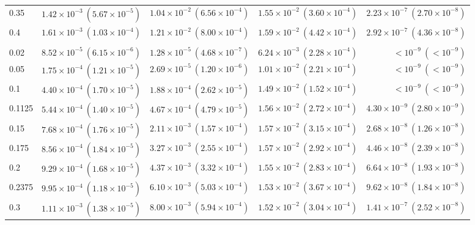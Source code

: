 \begin{table}[htbp]
\begin{tabular}{@{} l rrrr @{}}
0.35 & $1.42\!\times\!10^{-3}\ (5.67\!\times\!10^{-5})$ & $1.04\!\times\!10^{-2}\ (6.56\!\times\!10^{-4})$ & $1.55\!\times\!10^{-2}\ (3.60\!\times\!10^{-4})$ & $2.23\!\times\!10^{-7}\ (2.70\!\times\!10^{-8})$ \\
0.4 & $1.61\!\times\!10^{-3}\ (1.03\!\times\!10^{-4})$ & $1.21\!\times\!10^{-2}\ (8.00\!\times\!10^{-4})$ & $1.59\!\times\!10^{-2}\ (4.42\!\times\!10^{-4})$ & $2.92\!\times\!10^{-7}\ (4.36\!\times\!10^{-8})$ \\
\addlinespace
\multicolumn{5}{@{}l}{\textit{Wide ($p \sim \mathcal{U}(0.05, 0.3)$)}} \\
0.02 & $8.52\!\times\!10^{-5}\ (6.15\!\times\!10^{-6})$ & $1.28\!\times\!10^{-5}\ (4.68\!\times\!10^{-7})$ & $6.24\!\times\!10^{-3}\ (2.28\!\times\!10^{-4})$ & $<\!10^{-9}\ (<\!10^{-9})$ \\
0.05 & $1.75\!\times\!10^{-4}\ (1.21\!\times\!10^{-5})$ & $2.69\!\times\!10^{-5}\ (1.20\!\times\!10^{-6})$ & $1.01\!\times\!10^{-2}\ (2.21\!\times\!10^{-4})$ & $<\!10^{-9}\ (<\!10^{-9})$ \\
0.1 & $4.40\!\times\!10^{-4}\ (1.70\!\times\!10^{-5})$ & $1.88\!\times\!10^{-4}\ (2.62\!\times\!10^{-5})$ & $1.49\!\times\!10^{-2}\ (1.52\!\times\!10^{-4})$ & $<\!10^{-9}\ (<\!10^{-9})$ \\
0.1125 & $5.44\!\times\!10^{-4}\ (1.40\!\times\!10^{-5})$ & $4.67\!\times\!10^{-4}\ (4.79\!\times\!10^{-5})$ & $1.56\!\times\!10^{-2}\ (2.72\!\times\!10^{-4})$ & $4.30\!\times\!10^{-9}\ (2.80\!\times\!10^{-9})$ \\
0.15 & $7.68\!\times\!10^{-4}\ (1.76\!\times\!10^{-5})$ & $2.11\!\times\!10^{-3}\ (1.57\!\times\!10^{-4})$ & $1.57\!\times\!10^{-2}\ (3.15\!\times\!10^{-4})$ & $2.68\!\times\!10^{-8}\ (1.26\!\times\!10^{-8})$ \\
0.175 & $8.56\!\times\!10^{-4}\ (1.84\!\times\!10^{-5})$ & $3.27\!\times\!10^{-3}\ (2.55\!\times\!10^{-4})$ & $1.57\!\times\!10^{-2}\ (2.92\!\times\!10^{-4})$ & $4.46\!\times\!10^{-8}\ (2.39\!\times\!10^{-8})$ \\
0.2 & $9.29\!\times\!10^{-4}\ (1.68\!\times\!10^{-5})$ & $4.37\!\times\!10^{-3}\ (3.32\!\times\!10^{-4})$ & $1.55\!\times\!10^{-2}\ (2.83\!\times\!10^{-4})$ & $6.64\!\times\!10^{-8}\ (1.93\!\times\!10^{-8})$ \\
0.2375 & $9.95\!\times\!10^{-4}\ (1.18\!\times\!10^{-5})$ & $6.10\!\times\!10^{-3}\ (5.03\!\times\!10^{-4})$ & $1.53\!\times\!10^{-2}\ (3.67\!\times\!10^{-4})$ & $9.62\!\times\!10^{-8}\ (1.84\!\times\!10^{-8})$ \\
0.3 & $1.11\!\times\!10^{-3}\ (1.38\!\times\!10^{-5})$ & $8.00\!\times\!10^{-3}\ (5.94\!\times\!10^{-4})$ & $1.52\!\times\!10^{-2}\ (3.04\!\times\!10^{-4})$ & $1.41\!\times\!10^{-7}\ (2.52\!\times\!10^{-8})$ \\

\end{tabular}
\end{table}
